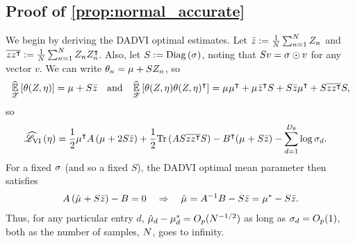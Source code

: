 
%
\def\zbar{\bar{z}}
\def\zzbar{\overline{zz^\trans}}
\def\sigmat{S}
\def\zcov{\hat{\Sigma}_{z}}

\subsection{Proof of \cref{prop:normal_accurate}}\label{app:normal_accurate_proof}
%
We begin by deriving the DADVI optimal estimates.  Let $\zbar :=
\meann \z_n$ and $\zzbar := \meann \z_n \z_n^\trans$.  Also, let $\sigmat :=
\diag{\etasigma}$, noting that $\sigmat v = \etasigma \odot v$ for any vector
$v$.
We can
write $\theta_n = \etamu + \sigmat \z_n$, so
%
\begin{align*}
%
\expecthat{\Z}{\theta(\z, \eta)} = \etamu + \sigmat \zbar
\quad\textrm{and}\quad
\expecthat{\Z}{\theta(\z, \eta) \theta(\z, \eta)^\trans} =
    \etamu \etamu^\trans +
    \etamu  \zbar^\trans \sigmat +
    \sigmat \zbar \etamu^\trans +
    \sigmat \zzbar \sigmat,
%
\end{align*}
%
so
%
\begin{align}\label{eq:mvn_dadvi_obj}
%
\klobj{\eta} ={}&
    \frac{1}{2} \etamu^\trans A \left(\etamu + 2 \sigmat \zbar \right) +
    \frac{1}{2} \trace{A \sigmat \zzbar \sigmat}
    -B^\trans (\etamu + \sigmat \zbar)
    -\sumd \log \etasigma[d].
%
\end{align}
%
For a fixed $\etasigma$ (and so a fixed $\sigmat$), the DADVI optimal
mean parameter then satisfies
%
\begin{align}\label{eq:normal_muhat}
%
A \left(\etamuhat + \sigmat \zbar \right) - B = 0
\quad\Rightarrow\quad
\etamuhat = A^{-1} B - \sigmat \zbar
= \etamu^{*} - \sigmat \zbar.
%
\end{align}
%
Thus, for any particular entry $d$, $\etamuhat[d] - \etamu[d]^{*} =
O_p(N^{-1/2})$ as long as $\etasigma[d] = O_p(1)$, both as the
number of samples, $\znum$, goes to infinity.

